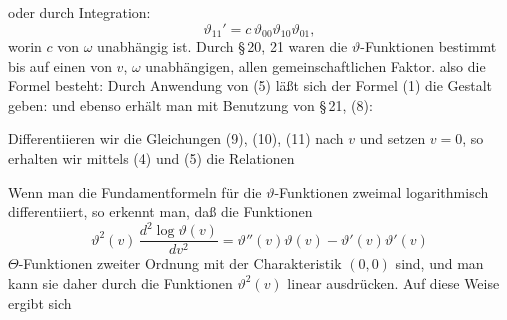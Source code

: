 oder durch Integration:
\[
\vartheta_{11}' = c\,\vartheta_{00}\vartheta_{10}\vartheta_{01},
\]
worin $c$ von $\omega$ unabhängig ist. Durch \S\,20, 21 waren die $\vartheta$-Funktionen bestimmt bis auf einen von $v$, $\omega$ unabhängigen, allen gemeinschaftlichen Faktor.  also die Formel besteht:
 Durch Anwendung von (5) läßt sich der Formel (1) die Gestalt geben:
und ebenso erhält man mit Benutzung von \S\,21, (8):

Differentiieren wir die Gleichungen (9), (10), (11) nach $v$ und setzen $v=0$, so erhalten wir mittels (4) und (5) die Relationen

Wenn man die Fundamentformeln %
für die $\vartheta$-Funktionen zweimal logarithmisch differentiiert, so erkennt man, daß die Funktionen
\[
\vartheta^2(v)\,\frac{d^2\log\vartheta(v)}{dv^2} = \vartheta''(v)\vartheta(v) - \vartheta'(v)\vartheta'(v)
\]
$\Theta$-Funktionen zweiter Ordnung mit der Charakteristik $(0,0)$ sind, und man kann sie daher durch die Funktionen $\vartheta^2(v)$ linear ausdrücken. Auf diese Weise ergibt sich
